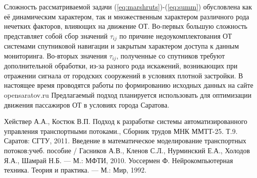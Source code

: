 \documentclass[a4paper,13pt]{article}
\begin{document}
Сложность рассматриваемой задачи (\ref{eq:marshruts})-(\ref{eq:summ}) обусловлена как её динамическим характером, так и множественным характером различного рода нечетких факторов, влияющих на движение ОТ. Во-первых большую сложность представляет собой сбор значений \begin{math}\tau_{ij}\end{math} по причине недоукомплектования ОТ системами спутниковой навигации и закрытым характером доступа к данным мониторинга. Во-вторых значения \begin{math}\tau_{ij}\end{math}, полученные со спутников требуют дополнительной обработки, из-за разного рода искажений, возникающих при отражении сигнала от городских сооружений в условиях плотной застройки. В настоящее время проводятся работы по формированию исходных данных на сайте opensaratov.ru Предлагаемый подход планируется использовать для оптимизации движения пассажиров ОТ в условиях города Саратова. 

\begin{thebibliography}{1}
 Хействер А.А., Костюк В.П. Подход к разработке системы автоматизированного управления транспортными потоками., Сборник трудов МНК ММТТ-25. Т.9. Саратов: СГТУ, 2011.
 Введение в математическое моделирование транспортных потоков:учеб. пособие / Гасников А.В., Кленов С.Л., Нурминский Е.А., Холодов Я.А., Шамрай Н.Б. — М.: МФТИ, 2010.
 Уоссермен Ф. Нейрокомпьютерная техника. Теория и практика. — М.: Мир, 1992.
\end{thebibliography}
\end{document}
